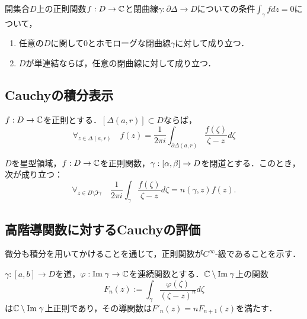 \documentclass[uplatex, dvipdfmx]{jsreport}
\begin{document}
\begin{theorem}[ホモロジーの言葉によるCauchyの定理]
    開集合$D$上の正則関数$f:D\to\mathbb{C}$と閉曲線$\gamma:\partial\Delta\to D$についての条件$\int_\gamma fdz=0$について，
    \begin{enumerate}
        \item 任意の$D$に関して$0$とホモローグな閉曲線$\gamma$に対して成り立つ．
        \item $D$が単連結ならば，任意の閉曲線に対して成り立つ．
    \end{enumerate}
\end{theorem}



\subsection{Cauchyの積分表示}

\begin{theorem}[閉円板に対するCauchyの積分表示]
    $f:D\to\mathbb{C}$を正則とする．$[\Delta(a,r)]\subset D$ならば，
    \[\forall_{z\in\Delta(a,r)}\quad f(z)=\frac{1}{2\pi i}\int_{\partial\Delta(a,r)}\frac{f(\zeta)}{\zeta-z}d\zeta\]
\end{theorem}

\begin{theorem}[一般の曲線に対するCauchyの積分表示]
    $D$を星型領域，$f:D\to\mathbb{C}$を正則関数，$\gamma:[\alpha,\beta]\to D$を閉道とする．このとき，次が成り立つ：
    \[\forall_{z\in D\setminus\Im\gamma}\quad\frac{1}{2\pi i}\int_\gamma\frac{f(\zeta)}{\zeta-z}d\zeta=n(\gamma,z)f(z).\]
\end{theorem}

\subsection{高階導関数に対するCauchyの評価}

\begin{tcolorbox}[colframe=ForestGreen, colback=ForestGreen!10!white,breakable,colbacktitle=ForestGreen!40!white,coltitle=black,fonttitle=\bfseries\sffamily,
title=]
    微分も積分を用いてかけることを通じて，正則関数が$C^\infty$-級であることを示す．
\end{tcolorbox}

\begin{lemma}
    $\gamma:[a,b]\to D$を道，$\varphi:\mathrm{Im}\;\gamma\to\mathbb{C}$を連続関数とする．$\mathbb{C}\setminus\mathrm{Im}\;\gamma$上の関数
    \[F_n(z):=\int_\gamma\frac{\varphi(\zeta)}{(\zeta-z)^n}d\zeta\]
    は$\mathbb{C}\setminus\mathrm{Im}\;\gamma$上正則であり，その導関数は$F'_n(z)=nF_{n+1}(z)$を満たす．
\end{lemma}
\end{document}
